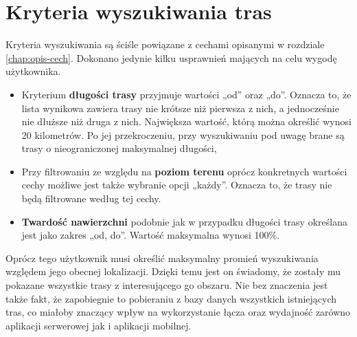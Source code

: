 \section{Kryteria wyszukiwania tras}
Kryteria wyszukiwania są ściśle powiązane z cechami opisanymi w rozdziale \ref{chap:opis-cech}. Dokonano jedynie kilku usprawnień mających na celu wygodę użytkownika.
\begin{itemize}
\item{Kryterium \textbf{długości trasy} przyjmuje wartości „od” oraz „do”. Oznacza to, że lista wynikowa zawiera trasy nie krótsze niż pierwsza z nich, a jednocześnie nie dłuższe niż druga z nich. Największa wartość, którą można określić wynosi 20 kilometrów.  Po jej przekroczeniu, przy wyszukiwaniu pod uwagę brane są trasy o nieograniczonej maksymalnej długości,}
\item{Przy filtrowaniu ze względu na \textbf{poziom terenu} oprócz konkretnych wartości cechy możliwe jest także wybranie opcji „każdy”. Oznacza to, że trasy nie będą filtrowane według tej cechy.}
\item{\textbf{Twardość nawierzchni} podobnie jak w przypadku długości trasy określana jest jako zakres  „od, do”. Wartość maksymalna wynosi 100\%.}
\end{itemize}
Oprócz tego użytkownik musi określić maksymalny promień wyszukiwania względem jego obecnej lokalizacji. Dzięki temu jest on świadomy, że zostały mu pokazane wszystkie trasy z interesującego go obszaru. Nie bez znaczenia jest także fakt, że zapobiegnie to pobieraniu z bazy danych wszystkich istniejących tras, co miałoby znaczący wpływ na wykorzystanie łącza oraz wydajność zarówno aplikacji serwerowej jak i aplikacji mobilnej.